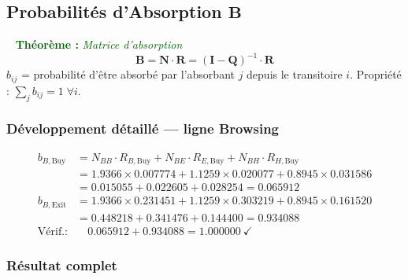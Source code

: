 \documentclass[11pt,a4paper]{article}
\newenvironment{thmbox}[1]{%
  \vspace{3pt}\begin{framed}
  \noindent{\color{DarkGreen}\rule{0.3cm}{3pt}}~%
  \textcolor{DarkGreen}{\textbf{Théorème :} \textit{#1}}\\[3pt]}
  {\end{framed}\vspace{3pt}}
\newcommand{\mat}[1]{\mathbf{#1}}
\begin{document}
\subsection{Probabilités d'Absorption \texorpdfstring{$\mat{B}$}{B}}

\begin{thmbox}{Matrice d'absorption}
\[
  \boxed{\mat{B} = \mat{N}\cdot\mat{R} = (\mat{I}-\mat{Q})^{-1}\cdot\mat{R}}
\]
$b_{ij}$ = probabilité d'être absorbé par l'absorbant $j$
depuis le transitoire $i$. Propriété : $\sum_j b_{ij} = 1\;\forall i$.
\end{thmbox}

\subsubsection{Développement détaillé --- ligne Browsing}

\begin{align*}
  b_{B,\text{Buy}}
  &= N_{BB}\!\cdot\!R_{B,\text{Buy}}
   + N_{BE}\!\cdot\!R_{E,\text{Buy}}
   + N_{BH}\!\cdot\!R_{H,\text{Buy}} \\
  &= 1.9366\!\times\!0.007774
   + 1.1259\!\times\!0.020077
   + 0.8945\!\times\!0.031586 \\
  &= 0.015055 + 0.022605 + 0.028254
   = \mathbf{0.065912} \\[6pt]
  b_{B,\text{Exit}}
  &= 1.9366\!\times\!0.231451
   + 1.1259\!\times\!0.303219
   + 0.8945\!\times\!0.161520 \\
  &= 0.448218 + 0.341476 + 0.144400
   = \mathbf{0.934088} \\[4pt]
  \text{Vérif.:}&\quad 0.065912 + 0.934088 = 1.000000\ \checkmark
\end{align*}

\subsubsection{Résultat complet}
\end{document}
